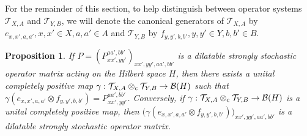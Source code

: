 \documentclass[11pt]{amsart}
\newtheorem{proposition}[theorem]{Proposition}
\newcommand{\cl}[1]{\mathcal{#1}}
\begin{document}
For the remainder of this section, to help distinguish between operator systems $\cl{T}_{X, A}$ and $\cl{T}_{Y, B}$, we will denote the canonical generators of $\cl{T}_{X, A}$ by $e_{x, x', a, a'}, x, x' \in X, a, a' \in A$ and $\cl{T}_{Y, B}$ by $f_{y, y', b, b'}, y, y' \in Y, b, b' \in B$. 

\begin{proposition}\label{dilate_ssop}
If $P = (P_{xx', yy'}^{aa', bb'})_{xx', yy', aa', bb'}$ is a dilatable strongly stochastic operator matrix acting on the Hilbert space $H$, then there exists a unital completely positive map $\gamma: \cl{T}_{X, A}\otimes_{\rm c} \cl{T}_{Y, B}\rightarrow \cl{B}(H)$ such that $\gamma(e_{x, x', a, a'}\otimes f_{y, y', b, b'}) = P_{xx', yy'}^{aa', bb'}$. Conversely, if $\gamma: \cl{T}_{X, A}\otimes_{\rm c}\cl{T}_{Y, B}\rightarrow \cl{B}(H)$ is a unital completely positive map, then $\big(\gamma(e_{x, x', a, a'}\otimes f_{y, y', b, b'})\big)_{xx', yy', aa', bb'}$ is a dilatable strongly stochastic operator matrix. 
\end{proposition}
\end{document}
